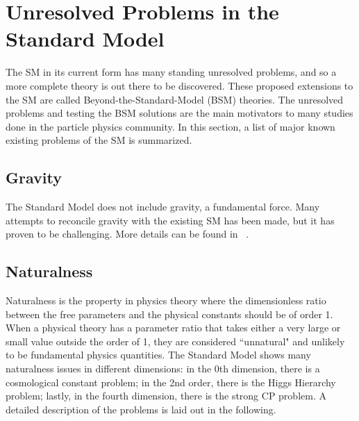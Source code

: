 {%



\section{Unresolved Problems in the Standard Model}
\label{sec:UnresolvedSM}
The SM in its current form has many standing unresolved problems, and so a more complete theory is out there to be discovered. These proposed extensions to the SM are called Beyond-the-Standard-Model (BSM) theories. The unresolved problems and testing the BSM solutions are the main motivators to many studies done in the particle physics community. In this section, a list of major known existing problems of the SM is summarized.

\subsection{Gravity}
The Standard Model does not include gravity, a fundamental force. Many attempts to reconcile gravity with the existing SM has been made, but it has proven to be challenging. More details can be found in ~\cite{sep-quantum-gravity}.

\subsection{Naturalness}
Naturalness is the property in physics theory where the dimensionless ratio between the free parameters and the physical constants should be of order 1. When a physical theory has a parameter ratio that takes either a very large or small value outside the order of 1, they are considered ``unnatural" and unlikely to be fundamental physics quantities. The Standard Model shows many naturalness issues in different dimensions: in the 0th dimension, there is a cosmological constant problem; in the 2nd order, there is the Higgs Hierarchy problem; lastly, in the fourth dimension, there is the strong CP problem. A detailed description of the problems is laid out in the following.

}
